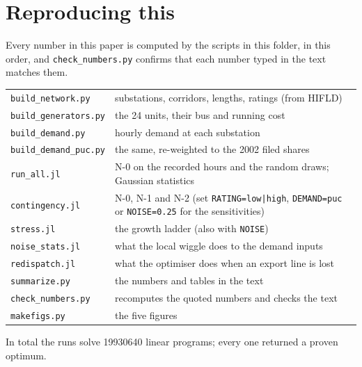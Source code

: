 \documentclass[11pt,a4paper]{article}
\begin{document}
\section{Reproducing this}

Every number in this paper is computed by the scripts in this folder, in this order,
and \texttt{check\_numbers.py} confirms that each number typed in the text matches
them.

\begin{center}
\small
\begin{tabular}{@{}lp{}@{}}
\toprule
\texttt{build\_network.py}    & substations, corridors, lengths, ratings (from HIFLD) \\
\texttt{build\_generators.py} & the 24 units, their bus and running cost \\
\texttt{build\_demand.py}     & hourly demand at each substation \\
\texttt{build\_demand\_puc.py}& the same, re-weighted to the 2002 filed shares \\
\texttt{run\_all.jl}          & N-0 on the recorded hours and the random draws;
                                Gaussian statistics \\
\texttt{contingency.jl}       & N-0, N-1 and N-2 (set \texttt{RATING=low|high},
                                \texttt{DEMAND=puc} or \texttt{NOISE=0.25} for the
                                sensitivities) \\
\texttt{stress.jl}            & the growth ladder (also with \texttt{NOISE}) \\
\texttt{noise\_stats.jl}      & what the local wiggle does to the demand inputs \\
\texttt{redispatch.jl}        & what the optimiser does when an export line is lost \\
\texttt{summarize.py}         & the numbers and tables in the text \\
\texttt{check\_numbers.py}     & recomputes the quoted numbers and checks the text \\
\texttt{makefigs.py}          & the five figures \\
\bottomrule
\end{tabular}
\end{center}

\noindent In total the runs solve \num{19930640} linear programs; every one returned a
proven optimum.
\end{document}
